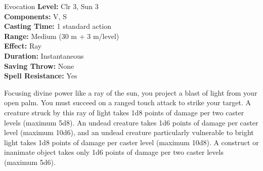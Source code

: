{Evocation}
{
	\textbf{Level:}
	Clr 3, Sun 3\\
	\textbf{Components:}
	V, S\\
	\textbf{Casting Time:}
	1 standard action\\
	\textbf{Range:}
	Medium (30 m + 3 m/level)\\
	\textbf{Effect:}
	Ray\\
	\textbf{Duration:}
	Instantaneous\\
	\textbf{Saving Throw:}
	None\\
	\textbf{Spell Resistance:}
	Yes\\
}
{
	Focusing divine power like a ray of the sun, you project a blast of light from your open palm. You must succeed on a ranged touch attack to strike your target. A creature struck by this ray of light takes 1d8 points of damage per two caster levels (maximum 5d8). An undead creature takes 1d6 points of damage per caster level (maximum 10d6), and an undead creature particularly vulnerable to bright light takes 1d8 points of damage per caster level (maximum 10d8). A construct or inanimate object takes only 1d6 points of damage per two caster levels (maximum 5d6).

}
